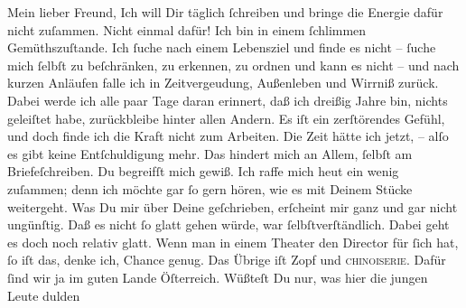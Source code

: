 \begin{ledgroupsized}[t]{13cm}
           \pstart\center{}Mein lieber Freund,\pend\pstart
           Ich will Dir täglich ſchreiben und bringe die Energie dafür nicht zuſammen. Nicht
               einmal dafür! Ich bin in einem ſchlimmen Gemüthszuſtande. Ich ſuche nach einem
               Lebensziel und finde es nicht – ſuche mich ſelbſt zu beſchränken, zu erkennen, zu
               ordnen und kann es nicht – und nach kurzen Anläufen falle ich in Zeitvergeudung,
               Außenleben und Wirrniß zurück. Dabei werde ich alle paar Tage daran erinnert, daß ich
               dreißig Jahre bin, nichts geleiſtet habe, zurückbleibe hinter allen Andern. Es iſt
               ein zerſtörendes Gefühl, und doch finde ich die {\pb}Kraft nicht zum Arbeiten. Die Zeit hätte ich jetzt, – alſo es gibt keine
               Entſchuldigung mehr. Das hindert mich an Allem, ſelbſt am Briefeſchreiben. Du
               begreifſt mich gewiß.\pend
           \pstart
           Ich raffe mich heut ein wenig zuſammen; denn ich
               möchte gar ſo gern hören, wie es mit Deinem Stücke weitergeht. Was Du mir über Deine \label{K_L02620-1v}\label{K_L02620-1h} geſchrieben, erſcheint mir ganz und gar nicht ungünſtig. Daß es nicht ſo
               glatt gehen würde, war ſelbſtverſtändlich. Dabei geht es doch noch relativ glatt.
               Wenn man in einem Theater den Director für ſich hat, ſo iſt das, denke ich, Chance
               genug. Das {\pb}Übrige iſt Zopf und \textsc{chinoiserie}. Dafür ſind wir ja im guten Lande Öſterreich. Wüßteſt Du nur, was hier die jungen Leute dulden

\end{ledgroupsized}
